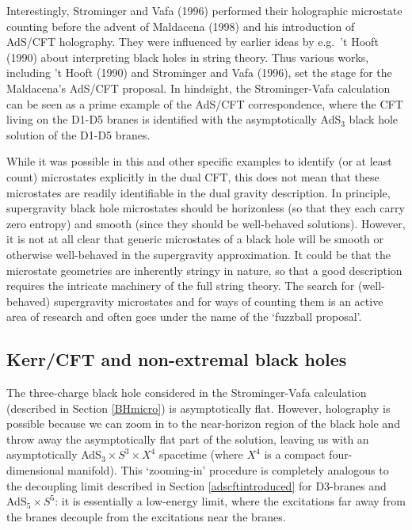 \documentclass[12pt]{article}
\renewcommand{\^}[1]{\hat{#1}}
\begin{document}
Interestingly, Strominger and Vafa (1996) performed their holographic microstate counting before the advent of Maldacena (1998) and his introduction of AdS/CFT holography. They were influenced by earlier ideas by e.g.~'t Hooft (1990) about interpreting black holes in string theory. Thus various works, including 't Hooft (1990) and Strominger and Vafa (1996), set the stage for the Maldacena's AdS/CFT proposal. In hindsight, the Strominger-Vafa calculation can be seen as a prime example of the AdS/CFT correspondence, where the CFT living on the D1-D5 branes is identified with the asymptotically AdS$_3$ black hole solution of the D1-D5 branes.

While it was possible in this and other specific examples to identify (or at least count) microstates explicitly in the dual CFT, this does not mean that these microstates are readily identifiable in the dual gravity description. In principle, supergravity black hole microstates should be horizonless (so that they each carry zero entropy) and smooth (since they should be well-behaved solutions). However, it is  not at all clear that generic microstates of a black hole will be smooth or otherwise well-behaved in the supergravity approximation. It could be that the microstate geometries are inherently stringy in nature, so that a good description requires the intricate machinery of the full string theory. The search for (well-behaved) supergravity microstates and for ways of counting them is an active area of research and often goes under the name of the `fuzzball proposal'.



\subsection{Kerr/CFT and non-extremal black holes}\label{kerr}
The three-charge black hole considered in the Strominger-Vafa calculation (described in Section \ref{BHmicro}) is asymptotically flat. However, holography is possible because we can zoom in to the near-horizon region of the black hole and throw away the asymptotically flat part of the solution, leaving us with an asymptotically AdS$_3\times S^3\times X^4$ spacetime (where $X^4$ is a compact four-dimensional manifold). This `zooming-in' procedure is completely analogous to the decoupling limit described in Section \ref{adscftintroduced} for D3-branes and AdS$_5\times S^5$: it is essentially a low-energy limit, where the excitations far away from the branes decouple from the excitations near the branes. 
\end{document}
